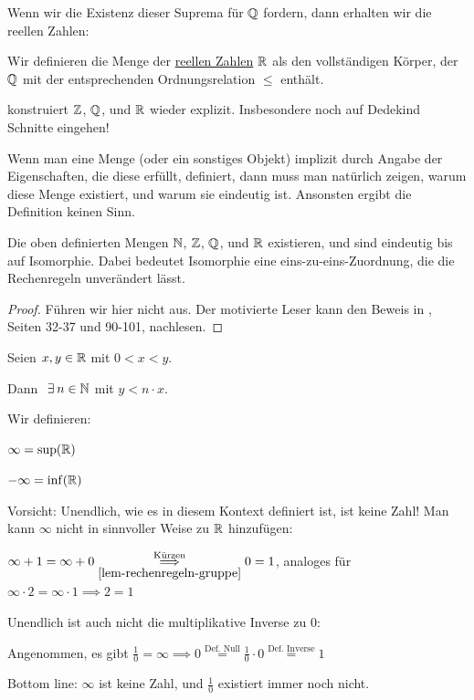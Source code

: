 Wenn wir die Existenz dieser Suprema für $\mathbb{Q}$ fordern, dann erhalten wir die reellen Zahlen:

\begin{definition}
    Wir definieren die Menge der \underline{reellen Zahlen} $\mathbb{R}$ als den vollständigen Körper, der $\mathbb{Q}$ mit der entsprechenden Ordnungsrelation $\leq$ enthält.
\end{definition}

\cite{GURAU} konstruiert $\mathbb{Z}$, $\mathbb{Q}$, und $\mathbb{R}$ wieder explizit. Insbesondere noch auf Dedekind Schnitte eingehen!

Wenn man eine Menge (oder ein sonstiges Objekt) implizit durch Angabe der Eigenschaften, die diese erfüllt, definiert, dann muss man natürlich zeigen, warum diese Menge existiert, und warum sie eindeutig ist. Ansonsten ergibt die Definition keinen Sinn.

\begin{theorem}[Zahlen]
    Die oben definierten Mengen $\mathbb{N}$, $\mathbb{Z}$, $\mathbb{Q}$, und $\mathbb{R}$ existieren, und sind eindeutig bis auf Isomorphie. Dabei bedeutet Isomorphie eine eins-zu-eins-Zuordnung, die die Rechenregeln unverändert lässt.
\end{theorem}
\begin{proof}
    Führen wir hier nicht aus. Der motivierte Leser kann den Beweis in \cite{Amann-Escher-1}, Seiten 32-37 und 90-101, nachlesen.
\end{proof}

\begin{proposition}
    Seien $x, y \in \mathbb{R}$ mit $0 < x < y$.
    
    Dann $\exists n \in \N$ mit $y < n \cdot x$.
\end{proposition}

\begin{definition}[Unendlich]
    Wir definieren:

    $\infty = \sup(\mathbb{R})$

    $- \infty = \inf(\mathbb{R})$
\end{definition}

\begin{remark}
    Vorsicht: Unendlich, wie es in diesem Kontext definiert ist, ist keine Zahl! Man kann $\infty$ nicht in sinnvoller Weise zu $\mathbb{R}$ hinzufügen:

    $\infty + 1 = \infty + 0 \overset{\text{Kürzen}}{\underset{\ref{lem-rechenregeln-gruppe}}{\implies}} 0 = 1$, analoges für $\infty \cdot 2 = \infty \cdot 1 \implies 2 = 1$

    Unendlich ist auch nicht die multiplikative Inverse zu $0$:
    
    Angenommen, es gibt $\frac{1}{0} = \infty \implies 0 \overset{\text{Def. Null}}{=}\frac{1}{0} \cdot 0 \overset{\text{Def. Inverse}}{=} 1$

    Bottom line: $\infty$ ist keine Zahl, und $\frac{1}{0}$ existiert immer noch nicht.
\end{remark}

